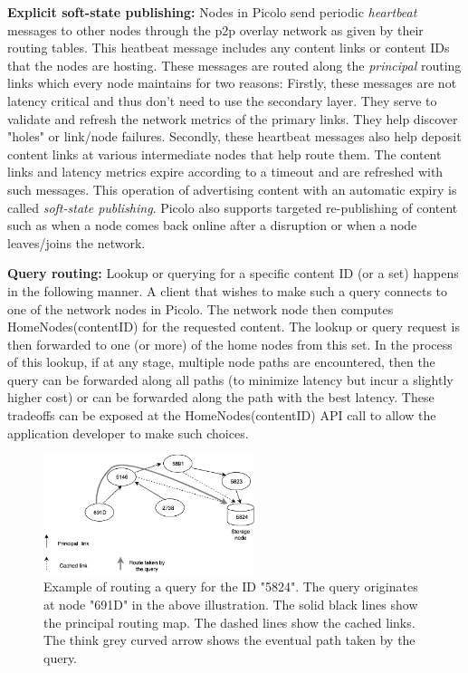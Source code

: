 \textbf{\newline Explicit soft-state publishing:} Nodes in \textsf{Picolo} send periodic {\em heartbeat} messages to other nodes through the
p2p overlay network as given by their routing tables. This heatbeat message includes any content links or content IDs
that the nodes are hosting. These messages are routed along the {\em principal} routing links which every node maintains
for two reasons: Firstly, these messages are not latency critical and thus don't need to use the secondary layer. They
serve to validate and refresh the network metrics of the primary links. They help discover "holes" or link/node
failures. Secondly, these heartbeat messages also help deposit content links at various intermediate nodes that help
route them. The content links and latency metrics expire according to a timeout and are refreshed with such messages.
This operation of advertising content with an automatic expiry is called {\em soft-state publishing}. \textsf{Picolo} also
supports targeted re-publishing of content such as when a node comes back online after a disruption or when a node
leaves/joins the network.

\textbf{\newline Query routing:} Lookup or querying for a specific content ID (or a set) happens in the following manner. A client
that wishes to make such a query connects to one of the network nodes in \textsf{Picolo}. The network node then computes
\textsf{HomeNodes(contentID)} for the requested content. The lookup or query request is then forwarded to one (or more)
of the home nodes from this set. In the process of this lookup, if at any stage, multiple node paths are encountered,
then the query can be forwarded along all paths (to minimize latency but incur a slightly higher cost) or can be
forwarded along the path with the best latency. These tradeoffs can be exposed at the \textsf{HomeNodes(contentID)} API
call to allow the application developer to make such choices.

\begin{figure}[t]
    \centering
    \includegraphics[width=0.55\textwidth]{fig/routing-eg.png}
  \caption{Example of routing a query for the ID "5824". The query originates at node "691D" in the above illustration.
    The solid black lines show the principal routing map. The dashed lines show the cached links. The think grey curved
    arrow shows the eventual path taken by the query.}
    \label{fig:routing-eg}
\end{figure}

